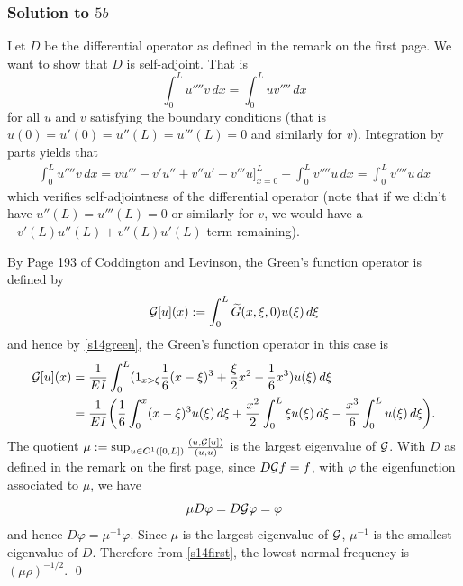 \subsubsection*{Solution to $5b$}
Let $D$ be the differential operator as defined in the remark on the first page. We want to show that $D$ is self-adjoint. That is
$$\int_{0}^{L}u'''' v\, dx = \int_{0}^{L}uv''''\, dx$$
for all $u$ and $v$ satisfying the boundary conditions (that is $u(0) = u'(0) = u''(L) = u'''(L) = 0$ and similarly for $v$). Integration by parts yields that
\begin{align*}
\int_{0}^{L}u''''v\, dx = vu''' - v'u'' + v'' u' - v'''u\bigg]_{x = 0}^{L} + \int_{0}^{L}v''''u\, dx = \int_{0}^{L}v'''' u\, dx
\end{align*}
which verifies self-adjointness of the differential operator (note that if we didn't have $u''(L) = u'''(L) = 0$ or similarly for $v$, we would have
a $-v'(L)u''(L) + v''(L)u'(L)$ term remaining).

By Page 193 of Coddington and Levinson, the Green's function operator is defined by
$$\mathcal{G}[u](x) := \int_{0}^{L}\widetilde{G}(x, \xi, 0)u(\xi)\, d\xi$$ and hence
by \eqref{s14green}, the Green's function operator in this case is
\begin{equation}\label{s14gop}
\begin{aligned}
\mathcal{G}[u](x) &= \frac{1}{EI}\int_{0}^{L}(1_{x > \xi}\frac{1}{6}(x - \xi)^{3} + \frac{\xi}{2}x^{2} - \frac{1}{6}x^{3})u(\xi)\, d\xi\\
&= \frac{1}{EI}\bigg(\frac{1}{6}\int_{0}^{x}(x - \xi)^{3}u(\xi)\, d\xi + \frac{x^{2}}{2}\int_{0}^{L}\xi u(\xi)\, d\xi - \frac{x^{3}}{6}\int_{0}^{L}u(\xi)\, d\xi\bigg).
\end{aligned}
\end{equation}
The quotient $\mu := \sup_{u \in C^{1}([0, L])}\frac{(u, \mathcal{G}[u])}{(u, u)}$ is the largest eigenvalue of $\mathcal{G}$. With $D$ as defined in the remark on the first page,
since $D\mathcal{G}f = f$, with $\varphi$ the eigenfunction
associated to $\mu$, we have
$$\mu D\varphi = D\mathcal{G}\varphi = \varphi$$ and hence $D\varphi = \mu^{-1}\varphi$. Since $\mu$ is the largest eigenvalue of $\mathcal{G}$, $\mu^{-1}$ is the smallest eigenvalue
of $D$. Therefore from \eqref{s14first}, the lowest normal frequency is $(\mu\rho)^{-1/2}$.
\hfill\qed

